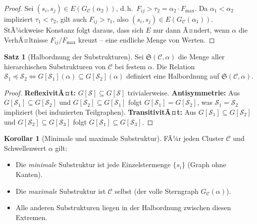 ﻿\documentclass[a4paper,12pt]{report}
\theoremstyle{definition}
\newtheorem{satz}{Satz}
\newtheorem{korollar}{Korollar}
\begin{document}
\begin{proof}
Sei $(s_i, s_j) \in E(G_\mathcal{C}(\alpha_2))$, d.\,h.\ $F_{ij} > \tau_2 = \alpha_2 \cdot F_\mathrm{max}$. Da $\alpha_1 < \alpha_2$ impliziert $\tau_1 < \tau_2$, gilt auch $F_{ij} > \tau_1$, also $(s_i, s_j) \in E(G_\mathcal{C}(\alpha_1))$. StÃ¼ckweise Konstanz folgt daraus, dass sich $E$ nur dann Ã¤ndert, wenn $\alpha$ die VerhÃ¤ltnisse $F_{ij}/F_\mathrm{max}$ kreuzt -- eine endliche Menge von Werten.
\end{proof}

\begin{satz}[Halbordnung der Substrukturen]
\label{satz:halbordnung}
Sei $\mathfrak{S}(\mathcal{C}, \alpha)$ die Menge aller hierarchischen Substrukturen von $\mathcal{C}$ bei festem $\alpha$. Die Relation $\mathcal{S}_1 \preceq \mathcal{S}_2 \iff G[\mathcal{S}_1](\alpha) \subseteq G[\mathcal{S}_2](\alpha)$ definiert eine Halbordnung auf $\mathfrak{S}(\mathcal{C}, \alpha)$.
\end{satz}

\begin{proof}
\textbf{ReflexivitÃ¤t:} $G[\mathcal{S}] \subseteq G[\mathcal{S}]$ trivialerweise.
\textbf{Antisymmetrie:} Aus $G[\mathcal{S}_1] \subseteq G[\mathcal{S}_2]$ und $G[\mathcal{S}_2] \subseteq G[\mathcal{S}_1]$ folgt $G[\mathcal{S}_1] = G[\mathcal{S}_2]$, was $\mathcal{S}_1 = \mathcal{S}_2$ impliziert (bei induzierten Teilgraphen).
\textbf{TransitivitÃ¤t:} Aus $G[\mathcal{S}_1] \subseteq G[\mathcal{S}_2]$ und $G[\mathcal{S}_2] \subseteq G[\mathcal{S}_3]$ folgt $G[\mathcal{S}_1] \subseteq G[\mathcal{S}_3]$.
\end{proof}

\begin{korollar}[Minimale und maximale Substruktur]
\label{kor:minmax}
FÃ¼r jeden Cluster $\mathcal{C}$ und Schwellenwert $\alpha$ gilt:
\begin{itemize}
    \item Die \emph{minimale} Substruktur ist jede Einzelstermenge $\{s_i\}$ (Graph ohne Kanten).
    \item Die \emph{maximale} Substruktur ist $\mathcal{C}$ selbst (der volle Sterngraph $G_\mathcal{C}(\alpha)$).
    \item Alle anderen Substrukturen liegen in der Halbordnung zwischen diesen Extremen.
\end{itemize}
\end{korollar}

\end{document}
